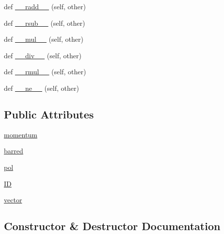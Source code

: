 \begin{DoxyCompactItemize}
def \hyperlink{class_py_spinor_1_1_spinor_1_1_spinor_1_1spinor_a5d6546fecf5c0457d02b4a903d0a850b}{\+\_\+\+\_\+radd\+\_\+\+\_\+} (self, other)
\item 
def \hyperlink{class_py_spinor_1_1_spinor_1_1_spinor_1_1spinor_a45fbedd6e65f08c465d791ad08e2e976}{\+\_\+\+\_\+rsub\+\_\+\+\_\+} (self, other)
\item 
def \hyperlink{class_py_spinor_1_1_spinor_1_1_spinor_1_1spinor_a825d92f2532b5bf5e0a1bb2c637e5376}{\+\_\+\+\_\+mul\+\_\+\+\_\+} (self, other)
\item 
def \hyperlink{class_py_spinor_1_1_spinor_1_1_spinor_1_1spinor_a28c2abeb6c45a5d1ba21250be157f7e7}{\+\_\+\+\_\+div\+\_\+\+\_\+} (self, other)
\item 
def \hyperlink{class_py_spinor_1_1_spinor_1_1_spinor_1_1spinor_a0bab993df788244b3901a80c0a395c69}{\+\_\+\+\_\+rmul\+\_\+\+\_\+} (self, other)
\item 
def \hyperlink{class_py_spinor_1_1_spinor_1_1_spinor_1_1spinor_a042d7392fe6ebf7e822971bb3050a3d2}{\+\_\+\+\_\+ne\+\_\+\+\_\+} (self, other)
\end{DoxyCompactItemize}
\subsection*{Public Attributes}
\begin{DoxyCompactItemize}
\item 
\hyperlink{class_py_spinor_1_1_spinor_1_1_spinor_1_1spinor_abe884cc066c6c81bfad50facf0f1abd4}{momentum}
\item 
\hyperlink{class_py_spinor_1_1_spinor_1_1_spinor_1_1spinor_a6d0116dfdbfd42c9593c742d84973e8c}{barred}
\item 
\hyperlink{class_py_spinor_1_1_spinor_1_1_spinor_1_1spinor_a44788846d9426038bd780f129ad388c6}{pol}
\item 
\hyperlink{class_py_spinor_1_1_spinor_1_1_spinor_1_1spinor_ab64828963b1152f66e897919680c082a}{I\+D}
\item 
\hyperlink{class_py_spinor_1_1_spinor_1_1_spinor_1_1spinor_ac1325eb3bbd07e47641e42fc150bed3f}{vector}
\end{DoxyCompactItemize}


\subsection{Constructor \& Destructor Documentation}
\hypertarget{class_py_spinor_1_1_spinor_1_1_spinor_1_1spinor_ac0ac1a9c34ee87ffdf28d0ccb75d70f6}{}
